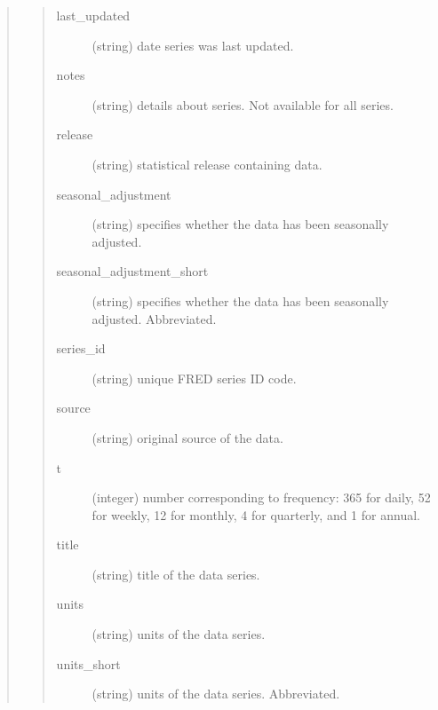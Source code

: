 \documentclass[letterpaper,10pt,openany,oneside,english]{sphinxmanual}
\begin{document}
\begin{fulllineitems}
\begin{quote}
\begin{quote}
\begin{description}
\item[{last\_updated}] \leavevmode
(string) \textendash{} date series was last updated.

\item[{notes}] \leavevmode
(string) \textendash{} details about series. Not available for all series.

\item[{release}] \leavevmode
(string) \textendash{} statistical release containing data.

\item[{seasonal\_adjustment}] \leavevmode
(string) \textendash{} specifies whether the data has been seasonally adjusted.

\item[{seasonal\_adjustment\_short}] \leavevmode
(string) \textendash{}specifies whether the data has been seasonally adjusted. Abbreviated.

\item[{series\_id}] \leavevmode
(string) \textendash{} unique FRED series ID code.

\item[{source}] \leavevmode
(string) \textendash{} original source of the data.

\item[{t}] \leavevmode
(integer) \textendash{} number corresponding to frequency: 365 for daily, 52 for weekly, 12 for monthly, 4 for quarterly, and 1 for annual.

\item[{title}] \leavevmode
(string) \textendash{} title of the data series.

\item[{units}] \leavevmode
(string) \textendash{} units of the data series.

\item[{units\_short}] \leavevmode
(string) units of the data series. Abbreviated.

\end{description}\end{quote}
\end{quote}

\begin{quote}


\end{quote}
\end{fulllineitems}
\end{document}

